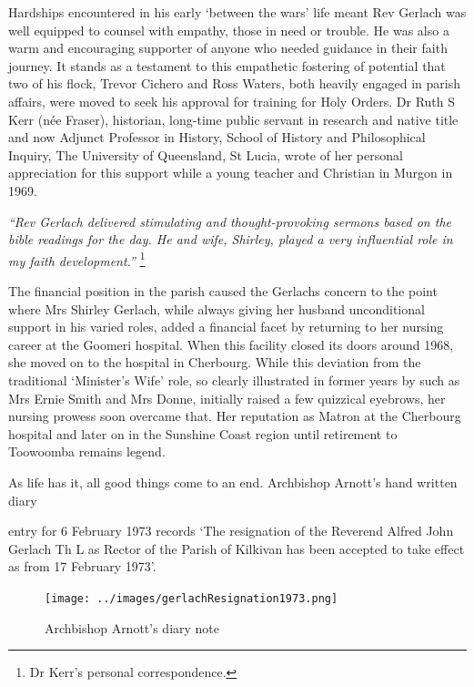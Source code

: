 Hardships encountered in his early `between the wars' life meant Rev Gerlach was well equipped to counsel with empathy, those in need or trouble. He was also a warm and encouraging supporter of anyone who needed guidance in their faith journey. It stands as a testament to this empathetic fostering of potential that two of his flock, Trevor Cichero and Ross Waters, both heavily engaged in parish affairs, were moved to seek his approval for training for Holy Orders. Dr Ruth S Kerr (née Fraser), historian, long-time public servant in research and native title and now Adjunct Professor in History, School of History and Philosophical Inquiry, The University of Queensland, St Lucia, wrote of her personal appreciation for this support while a young teacher and Christian in Murgon in 1969.



\emph{``Rev Gerlach delivered stimulating and thought-provoking sermons based on the bible readings for the day. He and wife, Shirley, played a very influential role in my faith development.''} \footnote{Dr Kerr's personal correspondence.}


The financial position in the parish caused the Gerlachs concern to the point where Mrs Shirley Gerlach, while always giving her husband unconditional support in his varied roles, added a financial facet by returning to her nursing career at the Goomeri hospital. When this facility closed its doors around 1968, she moved on to the hospital in Cherbourg. While this deviation from the traditional `Minister's Wife' role, so clearly illustrated in former years by such as Mrs Ernie Smith and Mrs Donne, initially raised a few quizzical eyebrows, her nursing prowess soon overcame that. Her reputation as Matron at the Cherbourg hospital and later on in the Sunshine Coast region until retirement to Toowoomba remains legend.



As life has it, all good things come to an end. Archbishop Arnott's hand written diary



entry for 6 February 1973 records `The resignation of the Reverend Alfred John Gerlach Th L as Rector of the Parish of Kilkivan has been accepted to take effect as from 17 February 1973'.









\begin{figure}[!htb]
\begin{center}
\texttt{[image: ../images/gerlachResignation1973.png]}
\caption{Archbishop Arnott's diary note}
\end{center}
\end{figure}




